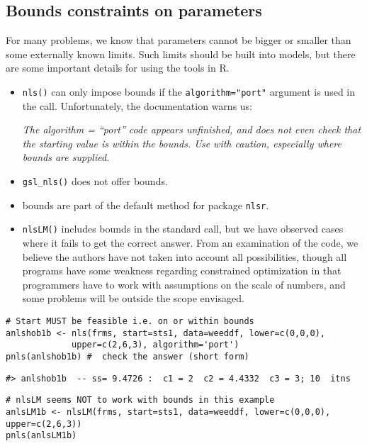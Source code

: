 \hypertarget{bounds-constraints-on-parameters}{%
\subsection{Bounds constraints on parameters}\label{bounds-constraints-on-parameters}}

For many problems, we know that parameters cannot be bigger or smaller than some
externally known limits. Such limits should be built into models, but there
are some important details for using the tools in R.

\begin{itemize}
\item
  \texttt{nls()} can only impose bounds if the \texttt{algorithm="port"} argument is
  used in the call. Unfortunately, the documentation warns us:

  \emph{The algorithm = ``port'' code appears unfinished, and does not even
  check that the starting value is within the bounds. Use with
  caution, especially where bounds are supplied.}
\item
  \texttt{gsl\_nls()} does not offer bounds.
\item
  bounds are part of the default method for package \texttt{nlsr}.
\item
  \texttt{nlsLM()} includes bounds in the standard call, but we have observed cases
  where it fails to get the correct answer. From an examination of the code,
  we believe the authors have not taken into account all possibilities, though
  all programs have some weakness regarding constrained optimization in that
  programmers have to work with assumptions on the scale of numbers,
  and some problems will be outside the scope envisaged.
\end{itemize}

\begin{verbatim}
# Start MUST be feasible i.e. on or within bounds
anlshob1b <- nls(frms, start=sts1, data=weeddf, lower=c(0,0,0),
             upper=c(2,6,3), algorithm='port')
pnls(anlshob1b) #  check the answer (short form)
\end{verbatim}

\begin{verbatim}
#> anlshob1b  -- ss= 9.4726 :  c1 = 2  c2 = 4.4332  c3 = 3; 10  itns
\end{verbatim}

\begin{verbatim}
# nlsLM seems NOT to work with bounds in this example
anlsLM1b <- nlsLM(frms, start=sts1, data=weeddf, lower=c(0,0,0), upper=c(2,6,3))
pnls(anlsLM1b)
\end{verbatim}


